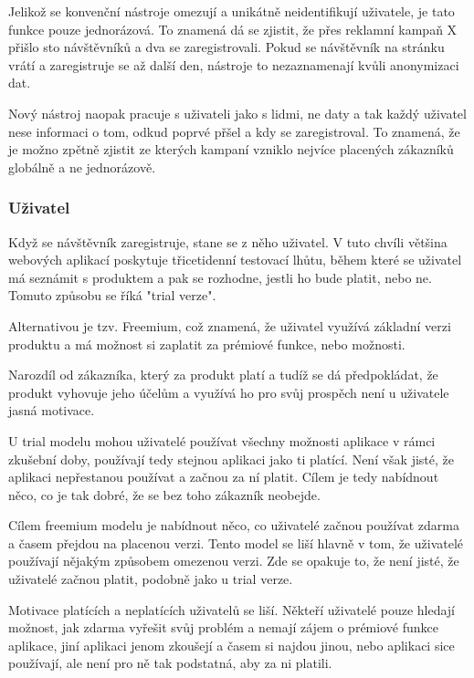 \documentclass[bc,female,java,dept456]{diploma}						%
\begin{document}
Jelikož se konvenční nástroje omezují a unikátně neidentifikují uživatele, je tato funkce pouze jednorázová. To znamená dá se zjistit, že přes reklamní kampaň X přišlo sto návštěvníků a dva se zaregistrovali. Pokud se návštěvník na stránku vrátí a zaregistruje se až další den, nástroje to nezaznamenají kvůli anonymizaci dat.

Nový nástroj naopak pracuje s uživateli jako s lidmi, ne daty a tak každý uživatel nese informaci o tom, odkud poprvé přšel a kdy se zaregistroval. To znamená, že je možno zpětně zjistit ze kterých kampaní vzniklo nejvíce placených zákazníků globálně a ne jednorázově.

\subsubsection{Uživatel}

Když se návštěvník zaregistruje, stane se z něho uživatel. V tuto chvíli většina webových aplikací poskytuje třicetidenní testovací lhůtu, během které se uživatel má seznámit s produktem a pak se rozhodne, jestli ho bude platit, nebo ne. Tomuto způsobu se říká "trial verze".

Alternativou je tzv. Freemium, což znamená, že uživatel využívá základní verzi produktu a má možnost si zaplatit za prémiové funkce, nebo možnosti.

Narozdíl od zákazníka, který za produkt platí a tudíž se dá předpokládat, že produkt vyhovuje jeho účelům a využívá ho pro svůj prospěch není u uživatele jasná motivace. 

U trial modelu mohou uživatelé používat všechny možnosti aplikace v rámci zkušební doby, používají tedy stejnou aplikaci jako ti platící. Není však jisté, že aplikaci nepřestanou používat a začnou za ní platit. Cílem je tedy nabídnout něco, co je tak dobré, že se bez toho zákazník neobejde.

Cílem freemium modelu je nabídnout něco, co uživatelé začnou používat zdarma a časem přejdou na placenou verzi. Tento model se liší hlavně v tom, že uživatelé používají nějakým způsobem omezenou verzi. Zde se opakuje to, že není jisté, že uživatelé začnou platit, podobně jako u trial verze.

Motivace platících a neplatících uživatelů se liší. Někteří uživatelé pouze hledají možnost, jak zdarma vyřešit svůj problém a nemají zájem o prémiové funkce aplikace, jiní aplikaci jenom zkoušejí a časem si najdou jinou, nebo aplikaci sice používají, ale není pro ně tak podstatná, aby za ni platili.
\end{document}
